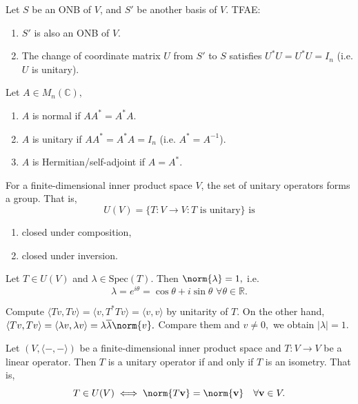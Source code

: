 \begin{theorem}
   Let $S$ be an ONB of $V$, and $S'$ be another basis of $V$. TFAE:
   \begin{enumerate}
    \item $S'$ is also an ONB of $V$.
    \item The change of coordinate matrix $U$ from $S'$ to $S$ satisfies $U^*U=U^*U=I_n$ (i.e. $U$ is unitary).
   \end{enumerate}
\end{theorem}

\begin{definition}
    Let $A\in M_n(\mathbb{C}),$
    \begin{enumerate}
        \item $A$ is normal if $AA^*=A^*A$.
        \item $A$ is unitary if $AA^*=A^*A = I_n$ (i.e. $A^*=A^{-1}$).
        \item $A$ is Hermitian/self-adjoint if $A=A^*$. 
    \end{enumerate}
\end{definition}

\begin{theorem}
    For a finite-dimensional inner product space $V$, the set of unitary operators forms a group.
    That is,
    $$U(V)=\{T:V\to V: T\text{ is unitary}\} \text{ is}$$
    \begin{enumerate}
        \item closed under composition,
        \item closed under inversion.
    \end{enumerate}
\end{theorem}

\begin{theorem}
    Let $T\in U(V)$ and $\lambda\in\mathrm{Spec}(T).$ Then $\norm{\lambda}=1,$ i.e. 
    $$\lambda=e^{i\theta}=\cos\theta + i\sin\theta\,\, \forall\theta\in\mathbb{R}.$$
\end{theorem}

\begin{pfbox}
Compute $\langle Tv, Tv\rangle = \langle v, T^*Tv\rangle =\langle v,v\rangle$ by unitarity of $T$.
On the other hand, $\langle Tv, Tv\rangle = \langle \lambda v, \lambda v\rangle = \lambda\overline{\lambda} \norm{v}.$
Compare them and $v\neq 0,$ we obtain $|\lambda| = 1.$
\end{pfbox}

\begin{theorem}
    Let $(V,\langle-,-\rangle)$ be a finite-dimensional inner product space and $T: V \to V$ be a linear operator. 
    Then $T$ is a unitary operator if and only if $T$ is an isometry. That is,
    $$ T \in U(V) \iff \norm{T\mathbf{v}} = \norm{\mathbf{v}} \quad \forall \mathbf{v} \in V. $$
\end{theorem}
